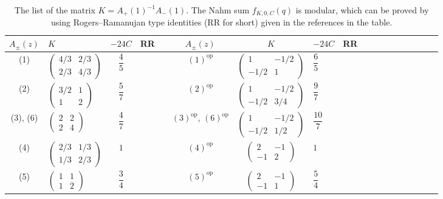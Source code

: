 \documentclass[10pt,a4paper]{amsart}
\numberwithin{equation}{section}
\theoremstyle{definition}
\begin{document}
\begin{table}[t]
 \centering
 \begin{tabular}{Sl | Sl | Sc | Sl | Sl | Sl | Sl | Sc | Sl} \hline
 $A_\pm (z)$ & $K$ & $-24C$ & RR & &
 $A_\pm (z)$ & $K$ & $-24C$ & RR \\ \hline
 (1) &
 $\begin{pmatrix}
 4/3 & 2/3 \\
 2/3 & 4/3
 \end{pmatrix}$ &
 $\dfrac{4}{5}$ &
 \cite{CherednikFeigin} & &
 $\mathrm{(1)}^{\mathrm{op}}$ &
 $\begin{pmatrix}
 1 & - 1/2 \\
 - 1/2 & 1
 \end{pmatrix}$ &
 $\dfrac{6}{5}$ &
 \cite{VlasenkoZwegers} \\
 (2) &
 $\begin{pmatrix}
 3/2 & 1 \\
 1 & 2
 \end{pmatrix}$ &
 $\dfrac{5}{7}$ &
 \cite{wang2022rank2} & &
 $\mathrm{(2)}^{\mathrm{op}}$ &
 $\begin{pmatrix}
 1 & -1/2 \\
 -1/2 & 3/4
 \end{pmatrix}$ &
 $\dfrac{9}{7}$ &
 \cite{wang2022rank2} \\
 (3), (6) &
 $\begin{pmatrix}
 2 & 2 \\
 2 & 4
 \end{pmatrix}$ &
 $\dfrac{4}{7}$ &
 \cite{Andrews74} & &
 $\mathrm{(3)}^{\mathrm{op}}$,
 $\mathrm{(6)}^{\mathrm{op}}$ &
 $\begin{pmatrix}
 1 & -1/2 \\
 -1/2 & 1/2
 \end{pmatrix}$ &
 $\dfrac{10}{7}$ &
 \cite{wang2022rank2} \\
 (4) &
 $\begin{pmatrix}
 2/3 & 1/3 \\
 1/3 & 2/3
 \end{pmatrix}$ &
 $1$ &
 \cite{Zagier} & &
 $\mathrm{(4)}^{\mathrm{op}}$ &
 $\begin{pmatrix}
 2 & -1 \\
 -1 & 2
 \end{pmatrix}$ &
 $1$ &
 \cite{Zagier} \\
 (5) &
 $\begin{pmatrix}
 1 & 1 \\
 1 & 2
 \end{pmatrix}$ &
 $\dfrac{3}{4}$ &
 \cite{wang2022rank2} & &
 $\mathrm{(5)}^{\mathrm{op}}$ &
 $\begin{pmatrix}
 2 & -1 \\
 -1 & 1
 \end{pmatrix}$ &
 $\dfrac{5}{4}$ &
 \cite{CalinescuMilasPenn16} \\
 \hline
 \end{tabular}
 \caption{The list of the matrix $K = A_+(1)^{-1} A_- (1)$. The Nahm sum $f_{K,0,C}(q)$ is modular,
 which can be proved by using Rogers--Ramanujan type identities (RR for short) given in the references
 in the table.} \label{table:Nahm sum}
\end{table}
\end{document}
